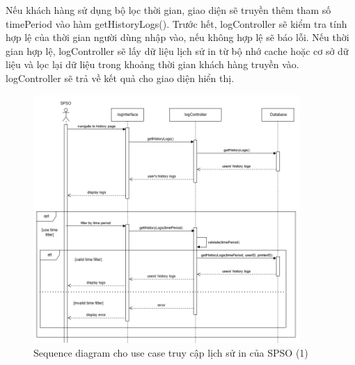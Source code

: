 Nếu khách hàng sử dụng bộ lọc thời gian, giao diện sẽ truyền thêm tham số timePeriod vào hàm getHistoryLogs(). Trước hết, logController sẽ kiểm tra tính hợp lệ của thời gian người dùng nhập vào, nếu không hợp lệ sẽ báo lỗi. Nếu thời gian hợp lệ, logController sẽ lấy dữ liệu lịch sử in từ bộ nhớ cache hoặc cơ sở dữ liệu và lọc lại dữ liệu trong khoảng thời gian khách hàng truyền vào. logController sẽ trả về kết quả cho giao diện hiển thị.

\begin{figure}[H]
    \begin{center}
        \includegraphics[width=0.9\textwidth]{Images/System Modelling/Logging(SPSO)_Sequence(1).png}
        \caption{Sequence diagram cho use case truy cập lịch sử in của SPSO (1)}
        \label{fig:arch}
    \end{center}
\end{figure}


